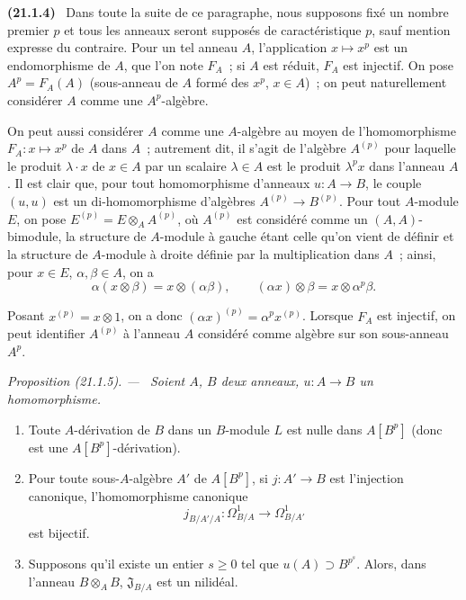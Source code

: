 \documentclass[10pt,oneside]{book}
\makeatletter
\newcommand{\setmanualcurrentlabel}[1]{\def\@currentlabel{#1}}
\newcommand{\oldpage}[2][]{%
  \setcounter{footnote}{0}%
  \marginpar{\scriptsize\textbf{#1}~|~#2}\ignorespaces}
\newenvironment{env}[1][]{\setmanualcurrentlabel{#1}\par\medskip\noindent\textbf{(#1)}\ }{\par}
\newenvironment{proposition}[1][]{%
  \setmanualcurrentlabel{#1}\par\medskip\noindent\itshape Proposition (#1). ---\ }{\par}
\makeatother
\begin{document}
\begin{env}[21.1.4]
\label{0.21.1.4-fr}
Dans toute la suite de ce paragraphe, nous supposons fixé un nombre premier
$p$ et tous les anneaux seront supposés de caractéristique $p$, sauf mention
expresse du contraire. Pour un tel anneau $A$, l'application $x\mapsto x^p$
est un endomorphisme de $A$, que l'on note $F_A$~; si $A$ est réduit, $F_A$
est injectif. On pose $A^p=F_A(A)$ (sous-anneau de $A$ formé des $x^p$,
$x\in A$)~; on peut naturellement considérer $A$ comme une $A^p$-algèbre.

On peut aussi considérer $A$ comme une $A$-algèbre au moyen de
l'homomorphisme $F_A:x\mapsto x^p$ de $A$ dans $A$~; autrement dit, il
s'agit de l'algèbre $A^{(p)}$ pour laquelle le produit $\lambda\cdot x$ de
$x\in A$ par un scalaire $\lambda\in A$ est le produit $\lambda^p x$ dans
l'anneau $A$. Il est clair que, pour tout homomorphisme d'anneaux $u:A\to B$,
le couple $(u,u)$ est un di-homomorphisme d'algèbres $A^{(p)}\to B^{(p)}$.
Pour tout $A$-module $E$, on pose $E^{(p)}=E\otimes_A A^{(p)}$, où
$A^{(p)}$ est considéré comme un $(A,A)$-bimodule, la structure de
$A$-module à gauche étant celle qu'on vient de définir et la structure de
$A$-module à droite définie par la multiplication dans $A$~; ainsi, pour
$x\in E$, $\alpha,\beta\in A$, on a
\[
  \alpha(x\otimes\beta)=x\otimes(\alpha\beta),\qquad
  (\alpha x)\otimes\beta=x\otimes\alpha^p\beta.
\]
\end{env}

\oldpage[0\textsubscript{IV-1}]{155}
Posant $x^{(p)}=x\otimes1$, on a donc $(\alpha x)^{(p)}=\alpha^p x^{(p)}$.
Lorsque $F_A$ est injectif, on peut identifier $A^{(p)}$ à l'anneau $A$
considéré comme algèbre sur son sous-anneau $A^p$.

\begin{proposition}[21.1.5]
\label{0.21.1.5-fr}
Soient $A$, $B$ deux anneaux, $u:A\to B$ un homomorphisme.
\begin{enumerate}
  \item[(i)] Toute $A$-dérivation de $B$ dans un $B$-module $L$ est nulle
  dans $A[B^p]$ (donc est une $A[B^p]$-dérivation).
  \item[(ii)] Pour toute sous-$A$-algèbre $A'$ de $A[B^p]$, si
  $j:A'\to B$ est l'injection canonique, l'homomorphisme canonique
  \[
  j_{B/A'/A}:\Omega^1_{B/A}\longrightarrow\Omega^1_{B/A'}
  \]
  est bijectif.
  \item[(iii)] Supposons qu'il existe un entier $s\geq0$ tel que
  $u(A)\supset B^{p^s}$. Alors, dans l'anneau $B\otimes_A B$,
  $\mathfrak J_{B/A}$ est un nilidéal.
\end{enumerate}
\end{proposition}
\end{document}
